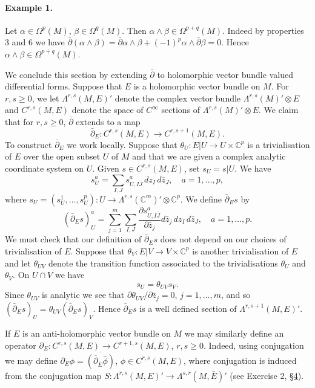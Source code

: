 \paragraph{Example 1.} Let $\alpha\in\Omega^p(M)$, $\beta\in\Omega^q(M)$. Then $\alpha\wedge\beta\in\Omega^{p+q}(M)$. Indeed by properties 3 and 6 we have $\bar\partial(\alpha\wedge\beta)=\bar\partial\alpha\wedge\beta+(-1)^p\alpha\wedge\bar\partial\beta=0$. Hence $\alpha\wedge\beta\in\Omega^{p+q}(M)$.

We conclude this section by extending $\bar\partial$ to holomorphic vector bundle valued differential forms. Suppose that $E$ is a holomorphic vector bundle on $M$. For $r,s\geq0$, we let $\Lambda^{r,s}(M,E)'$ denote the complex vector bundle $\Lambda^{r,s}(M)'\otimes E$ and $C^{r,s}(M,E)$ denote the space of $C^\infty$ sections of $\Lambda^{r,s}(M)'\otimes E$. We claim that for $r,s\geq0$, $\bar\partial$ extends to a map
\[\bar\partial_E:C^{r,s}(M,E)\to C^{r,s+1}(M,E).\]
To construct $\bar\partial_E$ we work locally. Suppose that $\theta_U:E|U\to U\times\mathbb C^p$ is a trivialisation of $E$ over the open subset $U$ of $M$ and that we are given
 a complex analytic coordinate system on $U$. Given $s\in C^{r,s}(M,E)$, set $s_U=s|U$. We have
\[s_U^a=\sum_{I,J}s_{U,I\bar J}^a\,dz_I\,d\bar z_J,\quad a=1,\ldots,p,\]
where $s_U=(s_U^1,\ldots,s_U^p):U\to\Lambda^{r,s}(\mathbb C^m)'\otimes\mathbb C^p$. We define $\bar\partial_Es$ by
\[(\bar\partial_Es)_U^a=\sum_{j=1}^m\sum_{I,J}\frac{\partial s_{U,I\bar J}^a}{\partial\bar z_j}d\bar z_j\,dz_I\,d\bar z_J,\quad a=1,\ldots,p.\]
We must check that our definition of $\bar\partial_Es$ does not depend on our choices of trivialisation of $E$. Suppose that $\theta_V:E|V\to V\times\mathbb C^p$ is another trivialisation of $E$ and let $\theta_{UV}$ denote the transition function associated to the trivialisations $\theta_U$ and $\theta_V$. On $U\cap V$ we have
\[s_U=\theta_{UV}s_V.\]
Since $\theta_{UV}$ is analytic we see that $\partial\theta_{UV}/\partial\bar z_j=0$, $j=1,\ldots,m$, and so $(\bar\partial_Es)_U=\theta_{UV}(\bar\partial_Es)_V$. Hence $\bar\partial_Es$ is a well defined section of $\Lambda^{r,s+1}(M,E)'$.

If $E$ is an anti-holomorphic vector bundle on $M$ we may similarly define an operator $\partial_E:C^{r,s}(M,E)\to C^{r+1,s}(M,E)$, $r,s\geq0$. Indeed, using conjugation we may define $\partial_E\phi=\overline{(\bar\partial_{\bar E}\bar\phi)}$, $\phi\in C^{r,s}(M,E)$, where conjugation is induced from the conjugation map $S:\Lambda^{r,s}(M,E)'\to\Lambda^{s,r}(M,\bar E)'$ (see Exercise 2, \hyperref[sec:5:4]{\S4}).

